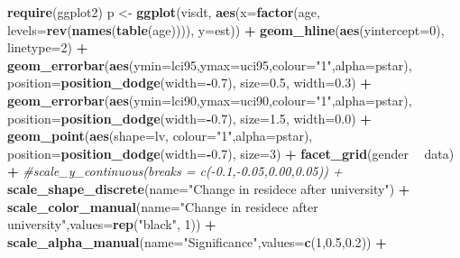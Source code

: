 \documentclass[
]{article}
\newenvironment{Shaded}{\begin{snugshade}}{\end{snugshade}}
\newcommand{\CommentTok}[1]{\textcolor[rgb]{0.56,0.35,0.01}{\textit{#1}}}
\newcommand{\DataTypeTok}[1]{\textcolor[rgb]{0.13,0.29,0.53}{#1}}
\newcommand{\DecValTok}[1]{\textcolor[rgb]{0.00,0.00,0.81}{#1}}
\newcommand{\FloatTok}[1]{\textcolor[rgb]{0.00,0.00,0.81}{#1}}
\newcommand{\KeywordTok}[1]{\textcolor[rgb]{0.13,0.29,0.53}{\textbf{#1}}}
\newcommand{\NormalTok}[1]{#1}
\newcommand{\OperatorTok}[1]{\textcolor[rgb]{0.81,0.36,0.00}{\textbf{#1}}}
\newcommand{\StringTok}[1]{\textcolor[rgb]{0.31,0.60,0.02}{#1}}
\begin{document}
\begin{Shaded}
\begin{Highlighting}[]
\KeywordTok{require}\NormalTok{(ggplot2)}
\NormalTok{p <-}\StringTok{ }\KeywordTok{ggplot}\NormalTok{(visdt, }\KeywordTok{aes}\NormalTok{(}\DataTypeTok{x=}\KeywordTok{factor}\NormalTok{(age, }\DataTypeTok{levels=}\KeywordTok{rev}\NormalTok{(}\KeywordTok{names}\NormalTok{(}\KeywordTok{table}\NormalTok{(age)))), }\DataTypeTok{y=}\NormalTok{est)) }\OperatorTok{+}
\StringTok{  }\KeywordTok{geom_hline}\NormalTok{(}\KeywordTok{aes}\NormalTok{(}\DataTypeTok{yintercept=}\DecValTok{0}\NormalTok{), }\DataTypeTok{linetype=}\DecValTok{2}\NormalTok{) }\OperatorTok{+}
\StringTok{  }\KeywordTok{geom_errorbar}\NormalTok{(}\KeywordTok{aes}\NormalTok{(}\DataTypeTok{ymin=}\NormalTok{lci95,}\DataTypeTok{ymax=}\NormalTok{uci95,}\DataTypeTok{colour=}\StringTok{"1"}\NormalTok{,}\DataTypeTok{alpha=}\NormalTok{pstar), }
                \DataTypeTok{position=}\KeywordTok{position_dodge}\NormalTok{(}\DataTypeTok{width=}\OperatorTok{-}\FloatTok{0.7}\NormalTok{), }\DataTypeTok{size=}\FloatTok{0.5}\NormalTok{, }\DataTypeTok{width=}\FloatTok{0.3}\NormalTok{) }\OperatorTok{+}
\StringTok{  }\KeywordTok{geom_errorbar}\NormalTok{(}\KeywordTok{aes}\NormalTok{(}\DataTypeTok{ymin=}\NormalTok{lci90,}\DataTypeTok{ymax=}\NormalTok{uci90,}\DataTypeTok{colour=}\StringTok{"1"}\NormalTok{,}\DataTypeTok{alpha=}\NormalTok{pstar),}
                \DataTypeTok{position=}\KeywordTok{position_dodge}\NormalTok{(}\DataTypeTok{width=}\OperatorTok{-}\FloatTok{0.7}\NormalTok{), }\DataTypeTok{size=}\FloatTok{1.5}\NormalTok{, }\DataTypeTok{width=}\FloatTok{0.0}\NormalTok{) }\OperatorTok{+}
\StringTok{  }\KeywordTok{geom_point}\NormalTok{(}\KeywordTok{aes}\NormalTok{(}\DataTypeTok{shape=}\NormalTok{lv, }\DataTypeTok{colour=}\StringTok{"1"}\NormalTok{,}\DataTypeTok{alpha=}\NormalTok{pstar),}
             \DataTypeTok{position=}\KeywordTok{position_dodge}\NormalTok{(}\DataTypeTok{width=}\OperatorTok{-}\FloatTok{0.7}\NormalTok{), }\DataTypeTok{size=}\DecValTok{3}\NormalTok{) }\OperatorTok{+}
\StringTok{  }\KeywordTok{facet_grid}\NormalTok{(gender }\OperatorTok{~}\StringTok{ }\NormalTok{data) }\OperatorTok{+}
\StringTok{  }\CommentTok{#scale_y_continuous(breaks = c(-0.1,-0.05,0.00,0.05)) + }
\StringTok{  }\KeywordTok{scale_shape_discrete}\NormalTok{(}\DataTypeTok{name=}\StringTok{"Change in residece after university"}\NormalTok{) }\OperatorTok{+}
\StringTok{  }\KeywordTok{scale_color_manual}\NormalTok{(}\DataTypeTok{name=}\StringTok{"Change in residece after university"}\NormalTok{,}\DataTypeTok{values=}\KeywordTok{rep}\NormalTok{(}\StringTok{"black"}\NormalTok{, }\DecValTok{1}\NormalTok{)) }\OperatorTok{+}
\StringTok{  }\KeywordTok{scale_alpha_manual}\NormalTok{(}\DataTypeTok{name=}\StringTok{"Significance"}\NormalTok{,}\DataTypeTok{values=}\KeywordTok{c}\NormalTok{(}\DecValTok{1}\NormalTok{,}\FloatTok{0.5}\NormalTok{,}\FloatTok{0.2}\NormalTok{)) }\OperatorTok{+}

\end{Highlighting}
\end{Shaded}
\end{document}
